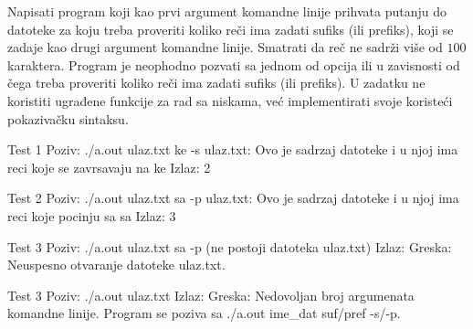 \begin{Exercise}[label=307]
Napisati program koji kao prvi argument komandne linije prihvata
putanju do datoteke za koju treba proveriti koliko reči ima
zadati sufiks (ili prefiks), koji se zadaje kao drugi argument
komandne linije. Smatrati da reč ne sadrži više od $100$ karaktera.
Program je neophodno pozvati sa jednom od opcija
 ili  u zavisnosti od čega treba proveriti
koliko reči ima zadati sufiks (ili prefiks). U zadatku ne
koristiti ugrađene funkcije za rad sa niskama, već
implementirati svoje koristeći pokazivačku sintaksu.

\begin{maxitest}
\begin{test}{Test 1}
Poziv:    ./a.out ulaz.txt ke -s
ulaz.txt: Ovo je sadrzaj datoteke i u njoj ima reci koje se 
          zavrsavaju na ke
Izlaz:    2
\end{test}
\end{maxitest}

\begin{maxitest}
\begin{test}{Test 2}
Poziv:    ./a.out ulaz.txt sa -p
ulaz.txt: Ovo je sadrzaj datoteke i u njoj ima reci koje 
          pocinju sa sa
Izlaz:    3
\end{test}
\end{maxitest}

\begin{maxitest}
\begin{test}{Test 3}
Poziv:  ./a.out ulaz.txt sa -p
(ne postoji datoteka ulaz.txt)
Izlaz:  Greska: Neuspesno otvaranje datoteke ulaz.txt.
\end{test}
\end{maxitest}

\begin{maxitest}
\begin{test}{Test 3}
Poziv:  ./a.out ulaz.txt
Izlaz:  Greska: Nedovoljan broj argumenata komandne linije.
        Program se poziva sa ./a.out ime_dat suf/pref -s/-p.
\end{test}
\end{maxitest}

\end{Exercise}
\begin{Answer}[ref=307]
\end{Answer}


